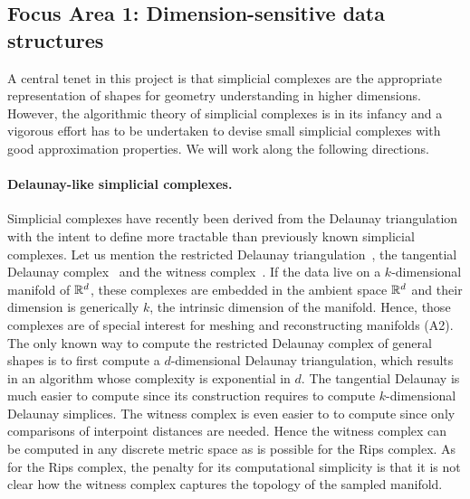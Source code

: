 \subsection*{Focus Area 1:  Dimension-sensitive data structures} 

A central tenet in this project is that simplicial complexes are the appropriate representation of shapes  for geometry understanding in higher dimensions. However,
the algorithmic theory of simplicial complexes is in its infancy and a vigorous effort has to be undertaken to devise small simplicial complexes with good approximation properties.
We will work along the following directions.



\paragraph{Delaunay-like  simplicial complexes.} 
Simplicial complexes have recently been derived from the Delaunay triangulation with the intent to
define more tractable than previously known simplicial complexes. Let us mention the restricted Delaunay triangulation~\cite{he-gtmg-2001}, the tangential Delaunay complex~\cite{geometrica-7142i} and the witness complex~\cite{cds-tewc-2004}. %
If the data live on a $k$-dimensional manifold of $\mathbb R ^d$, these complexes are embedded in the ambient space $\mathbb R^d$ and their dimension is generically $k$, the intrinsic dimension of the manifold.  Hence, those complexes are of special interest for meshing and reconstructing manifolds (A2).  The only known way to compute the restricted Delaunay complex of general shapes is to first compute a $d$-dimensional Delaunay triangulation, which results in an algorithm whose complexity is exponential in $d$. The tangential Delaunay is much easier to compute 
since its construction requires to compute $k$-dimensional Delaunay simplices.
The witness complex is even easier to to compute since only comparisons of interpoint distances are needed. Hence the witness complex can be computed in any discrete metric space as is possible for the Rips complex. 
As for the Rips complex, the penalty for its computational simplicity is that it is not clear how the witness complex captures the topology of the sampled manifold. 

